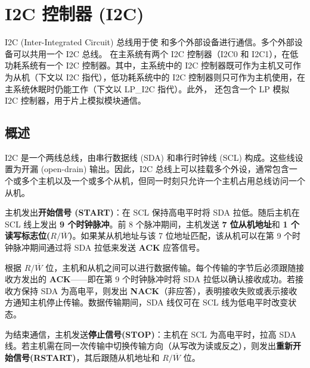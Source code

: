 \documentclass[main\_\_CN.tex]{subfiles}
\begin{document}
\setchineseformatting


\ifglobal
\else
    \clearpage
    \listoftodos
    \listofdonetodos
    \tableofcontents
\fi



\hypertarget{i2c}{}
\chapter{I2C 控制器 (I2C)}
\label{mod:i2c}


I2C (Inter-Integrated Circuit) 总线用于使 \chipname{} 和多个外部设备进行通信。多个外部设备可以共用一个 I2C 总线。\chipname{} 在主系统有两个 I2C 控制器（I2C0 和 I2C1），在低功耗系统有一个 I2C 控制器。其中，主系统中的 I2C 控制器既可作为主机又可作为从机（下文以 I2C 指代），低功耗系统中的 I2C 控制器则只可作为主机使用，在主系统休眠时仍能工作（下文以 LP\_I2C 指代）。此外，\chipname{} 还包含一个 LP 模拟 I2C 控制器，用于片上模拟模块通信。


\section{概述}
I2C 是一个两线总线，由串行数据线 (SDA) 和串行时钟线 (SCL) 构成。这些线设置为开漏 (open-drain) 输出。因此，I2C 总线上可以挂载多个外设，通常包含一个或多个主机以及一个或多个从机，但同一时刻只允许一个主机占用总线访问一个从机。

主机发出\textbf{开始信号 (START)}：在 SCL 保持高电平时将 SDA 拉低。随后主机在 SCL 线上发出 \textbf{9 个时钟脉冲}。前 8 个脉冲期间，主机发送 \textbf{7 位从机地址}和 \textbf{1 个读写标志位($R/\overline{W}$)}。如果某从机地址与该 7 位地址匹配，该从机可以在第 9 个时钟脉冲期间通过将 SDA 拉低来发送 \textbf{ACK} 应答信号。

根据 $R/\overline{W}$ 位，主机和从机之间可以进行数据传输。每个传输的字节后必须跟随接收方发出的 \textbf{ACK}——即在第 9 个时钟脉冲时将 SDA 拉低以确认接收成功。若接收方保持 SDA 为高电平，则发出 \textbf{NACK}（非应答），表明接收失败或表示接收方通知主机停止传输。数据传输期间，SDA 线仅可在 SCL 线为低电平时改变状态。

为结束通信，主机发送\textbf{停止信号(STOP)}：主机在 SCL 为高电平时，拉高 SDA 线。若主机需在同一次传输中切换传输方向（从写改为读或反之），则发出\textbf{重新开始信号(RSTART)}，其后跟随从机地址和 $R/\overline{W}$ 位。
\end{document}

